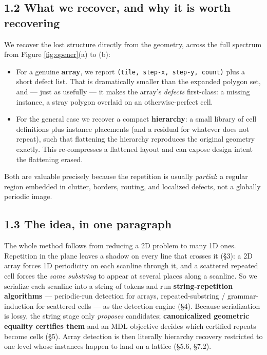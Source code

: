 \documentclass[
  11pt,
]{article}
\providecommand{\tightlist}{%
  \setlength{\itemsep}{0pt}\setlength{\parskip}{0pt}}
\begin{document}
\subsection{1.2 What we recover, and why it is worth
recovering}\label{what-we-recover-and-why-it-is-worth-recovering}

We recover the lost structure directly from the geometry, across the
full spectrum from Figure \ref{fig:opener}(a) to (b):

\begin{itemize}
\tightlist
\item
  For a genuine \textbf{array}, we report
  \texttt{(tile,\ step-x,\ step-y,\ count)} plus a short defect list.
  That is dramatically smaller than the expanded polygon set, and ---
  just as usefully --- it makes the array's \emph{defects} first-class:
  a missing instance, a stray polygon overlaid on an otherwise-perfect
  cell.
\item
  For the general case we recover a compact \textbf{hierarchy}: a small
  library of cell definitions plus instance placements (and a residual
  for whatever does not repeat), such that flattening the hierarchy
  reproduces the original geometry exactly. This re-compresses a
  flattened layout and can expose design intent the flattening erased.
\end{itemize}

Both are valuable precisely because the repetition is usually
\emph{partial}: a regular region embedded in clutter, borders, routing,
and localized defects, not a globally periodic image.

\subsection{1.3 The idea, in one
paragraph}\label{the-idea-in-one-paragraph}

The whole method follows from reducing a 2D problem to many 1D ones.
Repetition in the plane leaves a shadow on every line that crosses it
(§3): a 2D array forces 1D periodicity on each scanline through it, and
a scattered repeated cell forces the \emph{same substring} to appear at
several places along a scanline. So we serialize each scanline into a
string of tokens and run \textbf{string-repetition algorithms} ---
periodic-run detection for arrays, repeated-substring /
grammar-induction for scattered cells --- as the detection engine (§4).
Because serialization is lossy, the string stage only \emph{proposes}
candidates; \textbf{canonicalized geometric equality certifies them} and
an MDL objective decides which certified repeats become cells (§5).
Array detection is then literally hierarchy recovery restricted to one
level whose instances happen to land on a lattice (§5.6, §7.2).
\end{document}
